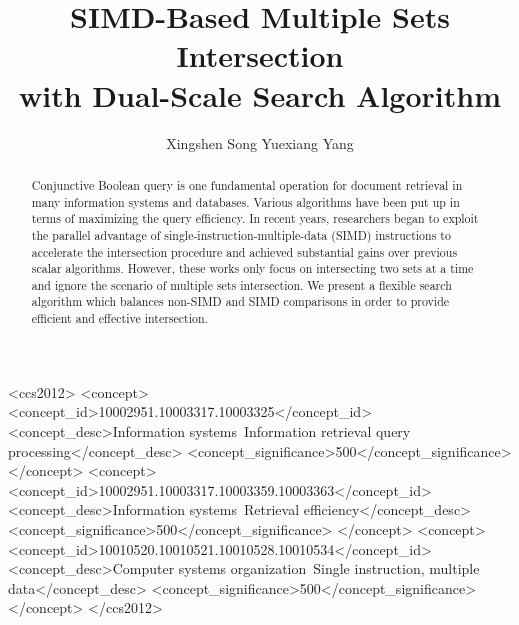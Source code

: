 \documentclass[sigconf,anonymous=true]{acmart}
\begin{document}
\title[SIMD-Based Multiple Sets Intersection with Dual-Scale Search Algorithm]{SIMD-Based Multiple Sets Intersection\\ with Dual-Scale Search Algorithm}


\author{Xingshen Song \qquad Yuexiang Yang}

\begin{abstract}
Conjunctive Boolean query is one fundamental operation for document retrieval in many information systems and databases.
Various algorithms have been put up in terms of maximizing the query efficiency.
In recent years, researchers began to exploit the parallel advantage of single-instruction-multiple-data (SIMD) instructions to accelerate the intersection procedure and achieved substantial gains over previous scalar algorithms.
However, these works only focus on intersecting two sets at a time and ignore the scenario of multiple sets intersection.
We present a flexible search algorithm which balances non-SIMD and SIMD comparisons in order to provide efficient and effective intersection.
\end{abstract}

%
%
\begin{CCSXML}
	<ccs2012>
	<concept>
	<concept_id>10002951.10003317.10003325</concept_id>
	<concept_desc>Information systems~Information retrieval query processing</concept_desc>
	<concept_significance>500</concept_significance>
	</concept>
	<concept>
	<concept_id>10002951.10003317.10003359.10003363</concept_id>
	<concept_desc>Information systems~Retrieval efficiency</concept_desc>
	<concept_significance>500</concept_significance>
	</concept>
	<concept>
	<concept_id>10010520.10010521.10010528.10010534</concept_id>
	<concept_desc>Computer systems organization~Single instruction, multiple data</concept_desc>
	<concept_significance>500</concept_significance>
	</concept>
	</ccs2012>
\end{CCSXML}
\end{document}
